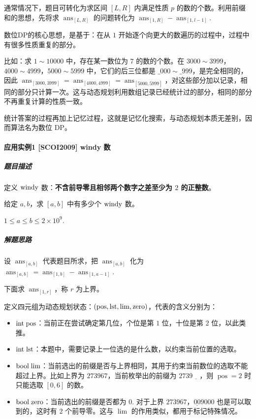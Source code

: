 通常情况下，题目可转化为求区间 \([L, R]\) 内满足性质 \(p\)
的数的个数。利用前缀和的思想，先将求 \(\operatorname{ans}_{[L,R]}\)
的问题转化为
\(\operatorname{ans}_{[1,R]}-\operatorname{ans}_{[1,l-1]}\).

数位DP的核心思想，是基于：在从 \(1\)
开始逐个向更大的数遍历的过程中，过程中有很多性质重复的部分。

比如：求 \(1\sim 10000\) 中，存在某一数位为 \(7\) 的数的个数。在
\(3000\sim3999\)，\(4000\sim4999\)，\(5000\sim 5999\)
中，它们的后三位都是 \(\_000\sim \_ 999\)，是完全相同的，因此
\(\operatorname{ans}_{[3000,3999]}=\operatorname{ans}_{[4000,4999]}=\operatorname{ans}_{[5000,5999]}\)，对这些部分加以记录，相同的部分只计算一次。这与动态规划利用数组记录已经统计过的部分，相同的部分不再重复计算的性质一致。

统计答案的过程再加上记忆过程，这就是记忆化搜索，与动态规划本质无差别，因而算法名为数位
DP。

\paragraph{应用实例1 {[}SCOI2009{]} windy 数}

\subparagraph{题目描述}

定义 \(\rm{windy}\) 数：\textbf{不含前导零且相邻两个数字之差至少为 \(2\)
的正整数}。

给定 \(a,b\)，求 \([a,b]\) 中有多少个 \(\rm{windy}\) 数。

\(1\leq a\leq b\leq 2\times 10^9\).

\subparagraph{解题思路}

设 \(\operatorname{ans}_{[a,b]}\) 代表题目所求，把
\(\operatorname{ans}_{[a,b]}\) 化为
\(\operatorname{ans}_{[a,b]}=\operatorname{ans}_{[1,b]}-\operatorname{ans}_{[1,a-1]}\).

下面求 \(\operatorname{ans}_{[1,r]}\)，称 \(r\) 为上界。

定义四元组为动态规划状态：\(\rm{(pos,lst,lim,zero)}\)，代表的含义分别为：

\begin{itemize}
\tightlist
\item
  \(\rm{int\;pos}\)：当前正在尝试确定第几位，个位是第 \(1\) 位，十位是第
  \(2\) 位，以此类推。
\item
  \(\rm{int \;lst}\)：本题中，需要记录上一位选的是什么数，以约束当前位置的选取。
\item
  \(\rm{bool\;lim}\)：当前选出的前缀是否与上界相同，其用于约束当前数位的选取不能超过上界。比如上界为
  \(273967\)，当前枚举出的前缀为 \(2739\underline{\quad}\)，则
  \(\operatorname{pos}=2\) 时只能选取 \([0,6]\) 的数。
\item
  \(\rm{bool\;zero}\)：当前选出的前缀是否都为 \(0\). 对于上界
  \(273967\)，\(\underline{00}9000\) 也是可以取到的，这时有 \(2\)
  个前导零。这与 \(\operatorname{lim}\) 的作用类似，都用于标记特殊情况。
\end{itemize}

